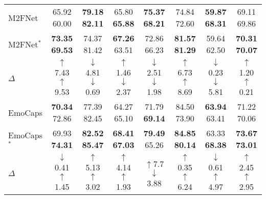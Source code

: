 {{\begin{table*}[!t]
{\begin{tabular}{l|ccccccc}
			M2FNet \cite{chudasama2022m2fnet}& {65.92 60.00} & \textbf{79.18 82.11} & 65.80 \textbf{65.88} & \textbf{75.37 68.21} & {74.84 72.60} & \textbf{59.87 68.31} & {69.11 69.86}\\
			\rowcolor{gray!30}
			M2FNet$^\ast$ & \textbf{73.35 69.53} & 74.37 81.42 & \textbf{67.26} 63.51 & {72.86} 66.23 & \textbf{81.57 81.29} & 59.64 62.50 & \textbf{70.31 70.07}\\ 
			$\Delta$ & \textcolor[rgb]{0.0,0.6,0.0}{$\uparrow$7.43} \textcolor[rgb]{0.0,0.6,0.0}{$\uparrow$9.53}  &  \textcolor[rgb]{0.2,0.2,0.2}{$\downarrow$4.81} \textcolor[rgb]{0.2,0.2,0.2}{$\downarrow$0.69}  & \textcolor[rgb]{0.0,0.6,0.0}{$\uparrow$1.46} \textcolor[rgb]{0.2,0.2,0.2}{$\downarrow$2.37}   & \textcolor[rgb]{0.2,0.2,0.2}{$\downarrow$2.51} \textcolor[rgb]{0.2,0.2,0.2}{$\downarrow$1.98}   & \textcolor[rgb]{0.0,0.6,0.0}{$\uparrow$6.73} \textcolor[rgb]{0.0,0.6,0.0}{$\uparrow$8.69}  & \textcolor[rgb]{0.2,0.2,0.2}{$\downarrow$0.23} \textcolor[rgb]{0.2,0.2,0.2}{$\downarrow$5.81}  & \textcolor[rgb]{0.0,0.6,0.0}{$\uparrow$1.20} \textcolor[rgb]{0.0,0.6,0.0}{$\uparrow$0.21} \\   \hline
			
			EmoCaps \cite{li2022emocaps}& {\textbf{70.34}} {72.86} & 77.39 82.45 & 64.27 65.10 & 71.79 \textbf{69.14} & 84.50 73.90 &\textbf{63.94} 63.41 & {71.22 70.06} \\
			\rowcolor{gray!30}
			EmoCaps$^\ast$ & {69.93} {\textbf{74.31}} & \textbf{82.52 85.47} & \textbf{68.41 67.03} & \textbf{79.49} 65.26 & \textbf{84.85 80.14} & 63.33 \textbf{68.38} & \textbf{73.67 73.01}\\ 
			$\Delta$ &  \textcolor[rgb]{0.2,0.2,0.2}{$\downarrow$0.41} \textcolor[rgb]{0.0,0.6,0.0}{$\uparrow$1.45}  &  \textcolor[rgb]{0.0,0.6,0.0}{$\uparrow$5.13} \textcolor[rgb]{0.0,0.6,0.0}{$\uparrow$3.02}  &  \textcolor[rgb]{0.0,0.6,0.0}{$\uparrow$4.14} \textcolor[rgb]{0.0,0.6,0.0}{$\uparrow$1.93}  & \textcolor[rgb]{0.0,0.6,0.0}{$\uparrow$7.7} \textcolor[rgb]{0.2,0.2,0.2}{$\downarrow$3.88}   & \textcolor[rgb]{0.0,0.6,0.0}{$\uparrow$0.35} \textcolor[rgb]{0.0,0.6,0.0}{$\uparrow$6.24}  & \textcolor[rgb]{0.2,0.2,0.2}{$\downarrow$0.61} \textcolor[rgb]{0.0,0.6,0.0}{$\uparrow$4.97}  & \textcolor[rgb]{0.0,0.6,0.0}{$\uparrow$2.45} \textcolor[rgb]{0.0,0.6,0.0}{$\uparrow$2.95} \\   \hline
	\end{tabular}}
\end{table*}

\begin{table*}[!t]
	

\end{table*}}}
